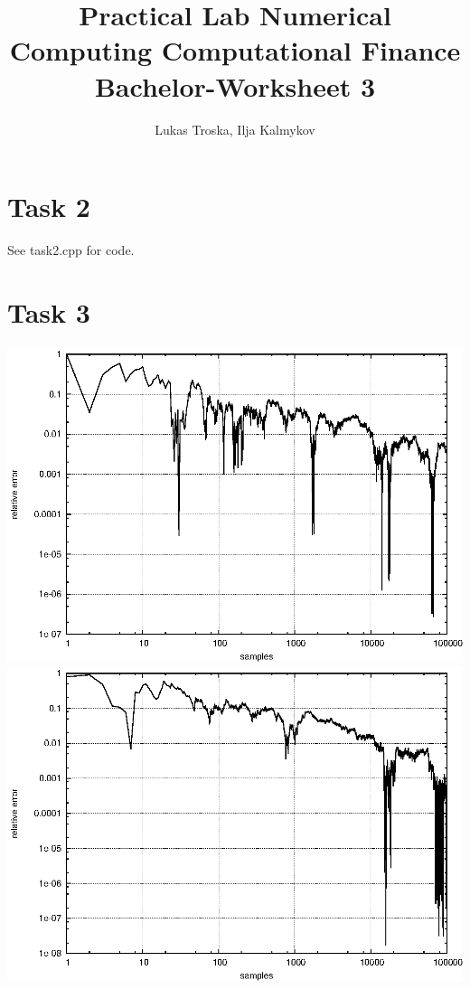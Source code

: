 \documentclass[]{article}
\title{Practical Lab Numerical Computing Computational Finance \\Bachelor-Worksheet 3}
\author{Lukas Troska, Ilja Kalmykov}
\date{}
\begin{document}
\maketitle
\section*{Task 2}
See task2.cpp for code.

\section*{Task 3}
\includegraphics{task3_10.eps}\\
\includegraphics{task3_200.eps}\\
\end{document}
